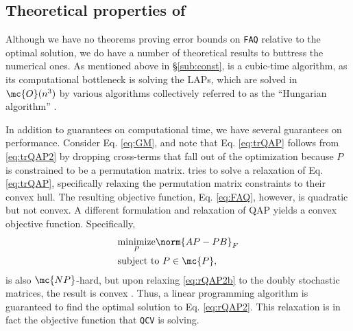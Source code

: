 \documentclass[11pt]{article}
\begin{document}
% 


\subsection{Theoretical properties of \FAQ} %
\label{sub:rqap_solves_qap_}

Although we have no theorems proving error bounds on \texttt{FAQ} relative to the optimal solution, we do have a number of theoretical results to buttress the numerical ones.  As mentioned above in \S \ref{sub:const}, \FAQ is a cubic-time algorithm, as its computational bottleneck is solving the LAPs, which are solved in $\mc{O}(n^3)$ by various algorithms collectively referred to as the ``Hungarian algorithm'' \cite{Jonker1987, Burkard2009}.   

In addition to guarantees on computational time, we have several guarantees on performance.  Consider Eq. \eqref{eq:GM}, and note that Eq. \eqref{eq:trQAP} follows from \eqref{eq:trQAP2} by 
% 
% 
dropping cross-terms that fall out of the optimization because $P$ is constrained to be a permutation matrix.  \FAQ tries to solve a relaxation of Eq. \eqref{eq:trQAP}, specifically relaxing the permutation matrix constraints to their convex hull.  The resulting objective function, Eq. \eqref{eq:FAQ}, however, is quadratic but not convex.  A different formulation and relaxation of QAP yields a convex objective function. Specifically,
\begin{subequations} \label{eq:rQAP2}
\begin{align} 
		&\underset{P}{\text{minimize}} 		\norm{AP - PB}_F   \label{eq:rQAP2a}\\
		&\text{subject to } 	 P \in \mc{P}, \label{eq:rQAP2b}
\end{align}
\end{subequations}
is also $\mc{NP}$-hard, but upon relaxing \eqref{eq:rQAP2b} to the doubly stochastic matrices, the result is convex \cite{Almohamad1993}.  Thus, a linear programming algorithm is guaranteed to find the optimal solution to Eq. \eqref{eq:rQAP2}.  This relaxation is in fact the objective function that \texttt{QCV} is solving.  
\end{document}
